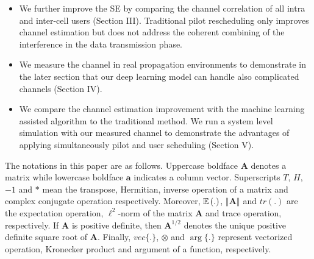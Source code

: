 \begin{itemize}
\item We further improve the SE by comparing the channel correlation of all intra and inter-cell users (Section III). Traditional pilot rescheduling only improves channel estimation but does not address the coherent combining of the interference in the data transmission phase.
\item We measure the channel in real propagation environments to demonstrate in the later section that our deep learning model can handle also complicated channels (Section IV). 
\item We compare the channel estimation improvement with the machine learning assisted algorithm to the traditional method. We run a system level simulation with our measured channel to demonstrate the advantages of applying simultaneously pilot and user scheduling (Section V).
\end{itemize}
The notations in this paper are as follows. Uppercase boldface $\mathbf{A}$ denotes a matrix while lowercase
boldface $\mathbf{a}$ indicates a column vector.
Superscripts $T$, $H$, $-1$ and $*$ mean the transpose, Hermitian, inverse operation of a matrix and complex conjugate operation respectively. Moreover, $\operatorname{\mathbb{E}}{(.)}$, $\left\Vert\mathbf{A}\right\Vert$ and $tr(.)$ are the expectation operation, $\ell^2$-norm of the matrix $\mathbf{A}$ and trace operation, respectively. If $\mathbf{A}$ is positive definite, then $\mathbf{A}^{1/2}$ denotes the unique positive definite square root of $\mathbf{A}$. Finally, $vec\{.\}$, $\otimes$ and $\arg\{.\}$ represent vectorized operation, Kronecker product and argument of a function, respectively.  


